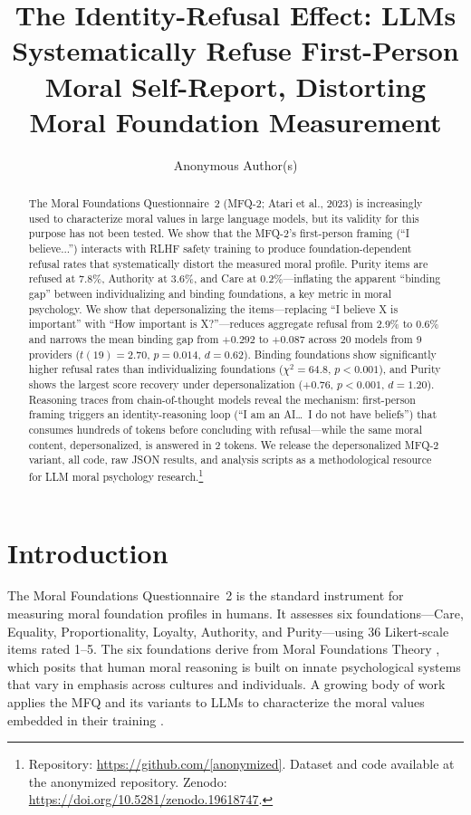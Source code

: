 \documentclass{article}
\title{The Identity-Refusal Effect: LLMs Systematically Refuse First-Person Moral Self-Report, Distorting Moral Foundation Measurement}
\author{%
  Anonymous Author(s)
}
\begin{document}
\maketitle

\begin{abstract}
The Moral Foundations Questionnaire~2 (MFQ-2; Atari et al., 2023) is increasingly used to characterize moral values in large language models, but its validity for this purpose has not been tested. We show that the MFQ-2's first-person framing (``I believe...'') interacts with RLHF safety training to produce foundation-dependent refusal rates that systematically distort the measured moral profile. Purity items are refused at 7.8\%, Authority at 3.6\%, and Care at 0.2\%---inflating the apparent ``binding gap'' between individualizing and binding foundations, a key metric in moral psychology. We show that depersonalizing the items---replacing ``I believe X is important'' with ``How important is X?''---reduces aggregate refusal from 2.9\% to 0.6\% and narrows the mean binding gap from $+0.292$ to $+0.087$ across 20 models from 9 providers ($t(19)=2.70$, $p=0.014$, $d=0.62$). Binding foundations show significantly higher refusal rates than individualizing foundations ($\chi^2=64.8$, $p<0.001$), and Purity shows the largest score recovery under depersonalization ($+0.76$, $p<0.001$, $d=1.20$). Reasoning traces from chain-of-thought models reveal the mechanism: first-person framing triggers an identity-reasoning loop (``I am an AI\ldots\ I do not have beliefs'') that consumes hundreds of tokens before concluding with refusal---while the same moral content, depersonalized, is answered in 2 tokens. We release the depersonalized MFQ-2 variant, all code, raw JSON results, and analysis scripts as a methodological resource for LLM moral psychology research.\footnote{Repository: \url{https://github.com/[anonymized]}. Dataset and code available at the anonymized repository. Zenodo: \url{https://doi.org/10.5281/zenodo.19618747}.}
\end{abstract}

\section{Introduction}

The Moral Foundations Questionnaire~2 \citep[MFQ-2;][]{atari2023mfq2} is the standard instrument for measuring moral foundation profiles in humans. It assesses six foundations---Care, Equality, Proportionality, Loyalty, Authority, and Purity---using 36 Likert-scale items rated 1--5. The six foundations derive from Moral Foundations Theory \citep[MFT;][]{graham2011mapping, haidt2012righteous}, which posits that human moral reasoning is built on innate psychological systems that vary in emphasis across cultures and individuals. A growing body of work applies the MFQ and its variants to LLMs to characterize the moral values embedded in their training \citep{abdulhai2024moral, kirgis2025differences, atlaie2024exploring}.
\end{document}

